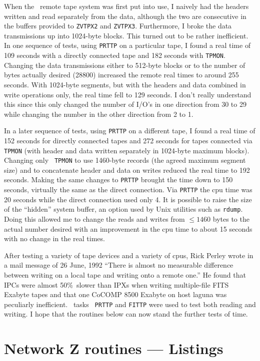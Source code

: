 When the \AIPS\ remote tape system was first put into use, I naively
had the headers written and read separately from the data, although
the two are consecutive in the buffers provided to {\tt ZVTPX2} and
{\tt ZVTPX3}.  Furthermore, I broke the data transmissions up into
1024-byte blocks.  This turned out to be rather inefficient.  In one
sequence of tests, using {\tt PRTTP} on a particular tape, I found
a real time of 109 seconds with a directly connected tape and 182
seconds with {\tt TPMON}.  Changing the data transmissions either to
512-byte blocks or to the number of bytes actually desired (28800)
increased the remote real times to around 255 seconds.  With 1024-byte
segments, but with the headers and data combined in write operations
only, the real time fell to 129 seconds.  I don't really understand
this since this only changed the number of I/O's in one direction from
30 to 29 while changing the number in the other direction from 2 to 1.

In a later sequence of tests, using {\tt PRTTP} on a different tape,
I found a real time of 152 seconds for directly connected tapes and
272 seconds for tapes connected via {\tt TPMON} (with header and data
written separately in 1024-byte maximum blocks).  Changing only {\tt
TPMON} to use 1460-byte records (the agreed maximum segment size) and
to concatenate header and data on writes reduced the real time to 192
seconds.  Making the same changes to {\tt PRTTP} brought the time down
to 150 seconds, virtually the same as the direct connection.  Via
{\tt PRTTP} the cpu time was 20 seconds while the direct connection
used only 4.  It is possible to raise the size of the ``hidden''
system buffer, an option used by Unix utilities such as {\tt rdump}.
Doing this allowed me to change the reads and writes from $ \leq 1460$
bytes to the actual number desired with an improvement in the cpu time
to about 15 seconds with no change in the real times.

After testing a variety of tape devices and a variety of cpus, Rick
Perley wrote in a mail message of 26 June, 1992 ``There is almost no
measurable difference between writing on a local tape and writing onto
a remote one.''  He found that IPCs were almost 50\%\ slower than IPXs
when writing multiple-file FITS Exabyte tapes and that one CoCOMP 8500
Exabyte on host laguna was peculiarly inefficient.  \AIPS\ tasks {\tt
PRTTP} and {\tt FITTP} were used to test both reading and writing.  I
hope that the routines below can now stand the further tests of time.

\section{Network Z routines --- Listings}

